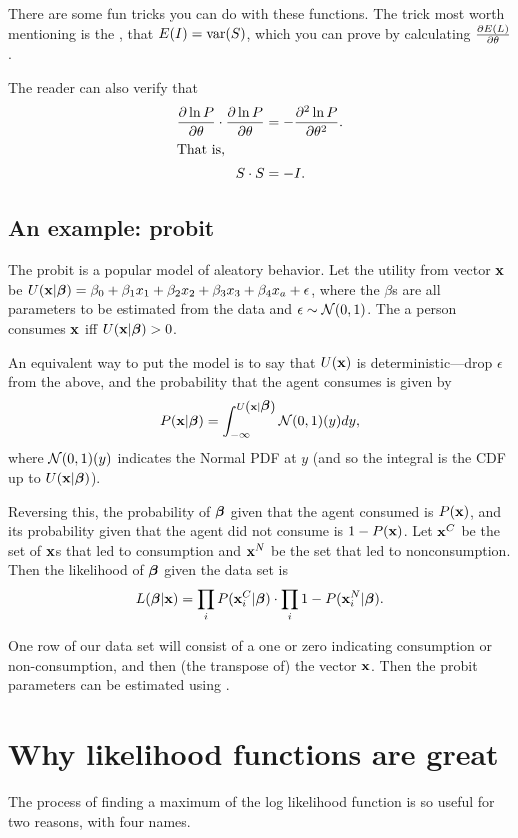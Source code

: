 There are some fun tricks you can do with these functions.
The trick most worth mentioning is the
, that $E(I)=\operatorname{var}(S)$, which you can prove by
calculating ${\partial E(L)\over \partial \theta}$.

The reader can also verify that 
\begin{align}
\frac{\partial \ln P}{\partial \theta}\cdot \frac{\partial \ln P}{\partial \theta} &= -\frac{\partial^2 \ln P}{\partial \theta^2}.\nonumber\\
\intertext{That is,}
S\cdot S &= -I.\nonumber
\end{align}


\subsection{An example: probit} 
The probit is a popular model of aleatory behavior. 
Let the utility from vector ${\bf x}$ be 
$U({\bf x}|{\mbox{\boldmath$\beta$}}) = \beta_0 + \beta_1 x_1 + \beta_2 x_2 + \beta_3 x_3 + \beta_4 x_a + \epsilon$,
where the $\beta$s are all parameters to be estimated from
the data and $\epsilon \sim {\cal N}(0,1)$.
The a person consumes ${\bf x}$ iff $U({\bf x}|{\mbox{\boldmath$\beta$}})>0$. 

An equivalent way to put the model is to say that $U({\bf x})$ is
deterministic---drop $\epsilon$ from the above, and the probability that
the agent consumes is given by
$$P({\bf x}|{\mbox{\boldmath$\beta$}}) = \int_{-\infty}^{U\left({\bf x}|{\mbox{\boldmath$\beta$}}\right)} {\cal N}(0,1)(y) dy,$$
where ${\cal N}(0,1)(y)$ indicates the Normal PDF at $y$ (and so the
integral is the CDF up to $U({\bf x}|{\mbox{\boldmath$\beta$}})$).

Reversing this, the probability of ${\mbox{\boldmath$\beta$}}$ given that the agent
consumed is $P({\bf x})$, and its probability given that the agent did not
consume is $1-P({\bf x})$. Let ${\bf x}^C$ be the set of ${\bf x}$s that led to
consumption and ${\bf x}^N$ be the set that led to nonconsumption. Then the
likelihood of ${\mbox{\boldmath$\beta$}}$ given the data set is 
$$L({\mbox{\boldmath$\beta$}}|{\bf x}) = \prod_{i} P({\bf x}^C_i|{\mbox{\boldmath$\beta$}}) \cdot \prod_{i} 1-P({\bf x}^N_i|{\mbox{\boldmath$\beta$}}).$$ 

One row of our data set will consist of a one or zero indicating
consumption or non-consumption, and then (the transpose of) the vector
${\bf x}$. Then the probit parameters can be estimated using
.

\section{Why likelihood functions are great} The process of finding a
maximum of the log likelihood function is 
so useful for two reasons, with four names.

